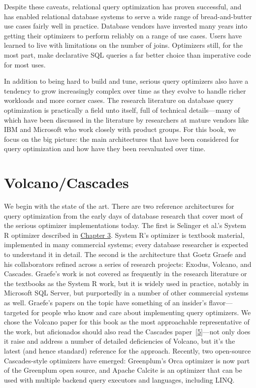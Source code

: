 \documentclass[b5paper,11pt,twoside,openright]{book}
\newcommand\Section[2]{
  \hypertarget{#1}{
    \section{#2}\label{#1}
  }
}
\begin{document}
Despite these caveats, relational query optimization has proven
successful, and has enabled relational database systems to serve a wide
range of bread-and-butter use cases fairly well in practice. Database
vendors have invested many years into getting their optimizers to
perform reliably on a range of use cases. Users have learned to live
with limitations on the number of joins. Optimizers still, for the most
part, make declarative SQL queries a far better choice than imperative
code for most uses.

In addition to being hard to build and tune, serious query optimizers
also have a tendency to grow increasingly complex over time as they
evolve to handle richer workloads and more corner cases. The research
literature on database query optimization is practically a field unto
itself, full of technical details---many of which have been discussed in
the literature by researchers at mature vendors like IBM and Microsoft
who work closely with product groups. For this book, we focus on the big
picture: the main architectures that have been considered for query
optimization and how have they been reevaluated over time.

\Section{volcanocascades}{%
Volcano/Cascades
}

We begin with the state of the art. There are two reference
architectures for query optimization from the early days of database
research that cover most of the serious optimizer implementations today.
The first is Selinger et al.'s System R optimizer described in
\hyperref[ch3-techniques]{Chapter 3}. System R's optimizer is textbook
material, implemented in many commercial systems; every database
researcher is expected to understand it in detail. The second is the
architecture that Goetz Graefe and his collaborators refined across a
series of research projects: Exodus, Volcano, and Cascades. Graefe's
work is not covered as frequently in the research literature or the
textbooks as the System R work, but it is widely used in practice,
notably in Microsoft SQL Server, but purportedly in a number of other
commercial systems as well. Graefe's papers on the topic have something
of an insider's flavor---targeted for people who know and care about
implementing query optimizers. We chose the Volcano paper for this book
as the most approachable representative of the work, but aficionados
should also read the Cascades
paper~{{[}\protect\hyperlink{ref-graefe1995cascades}{5}{]}}---not only
does it raise and address a number of detailed deficiencies of Volcano,
but it's the latest (and hence standard) reference for the approach.
Recently, two open-source Cascades-style optimizers have emerged:
Greenplum's Orca optimizer is now part of the Greenplum open source, and
Apache Calcite is an optimizer that can be used with multiple backend
query executors and languages, including LINQ.
\end{document}
